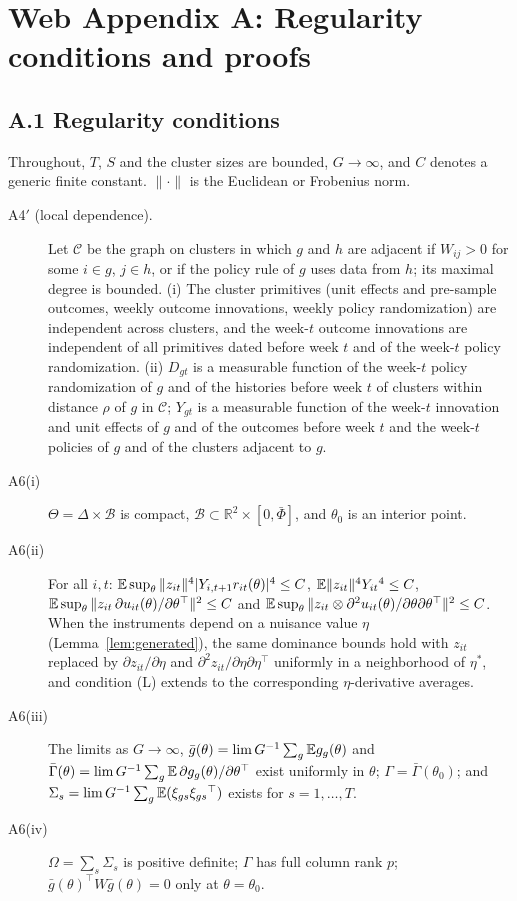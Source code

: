 \appendix
\setcounter{lemma}{2}

\section*{Web Appendix A: Regularity conditions and proofs}
\label{app:proofs}

\subsection{A.1 Regularity conditions}

Throughout, $T$, $S$ and the cluster sizes are bounded, $G\to\infty$, and $C$ denotes a generic
finite constant. $\|\cdot\|$ is the Euclidean or Frobenius norm.

\begin{description}
\item[A4$'$ (local dependence).] Let $\mathcal C$ be the graph on clusters in which $g$ and $h$
are adjacent if $W_{ij}>0$ for some $i\in g$, $j\in h$, or if the policy rule of $g$ uses data
from $h$; its maximal degree is bounded. (i) The cluster primitives (unit effects and pre-sample
outcomes, weekly outcome innovations, weekly policy randomization) are independent across
clusters, and the week-$t$ outcome innovations are independent of all primitives dated before
week $t$ and of the week-$t$ policy randomization. (ii) $D_{gt}$ is a measurable function of the
week-$t$ policy randomization of $g$ and of the histories before week $t$ of clusters within
distance $\rho$ of $g$ in $\mathcal C$; $Y_{gt}$ is a measurable function of the week-$t$ innovation
and unit effects of $g$ and of the outcomes before week $t$ and the week-$t$ policies of $g$ and
of the clusters adjacent to $g$.
\item[A6(i)] $\Theta=\Delta\times\mathcal B$ is compact, $\mathcal B\subset\mathbb R^2\times[0,\bar\Phi]$,
and $\theta_0$ is an interior point.
\item[A6(ii)] For all $i,t$: $\mathbb{E}\sup_\theta\|z_{it}\|^4|Y_{i,t+1}r_{it}(\theta)|^4\le C$,
$\mathbb{E}\|z_{it}\|^4Y_{it}{}^4\le C$, $\mathbb{E}\sup_\theta\|z_{it}\,\partial u_{it}(\theta)/\partial\theta^{\top}\|^2\le C$ and
$\mathbb{E}\sup_\theta\|z_{it}\otimes\partial^2u_{it}(\theta)/\partial\theta\partial\theta^{\top}\|^2\le C$. When the
instruments depend on a nuisance value $\eta$ (Lemma~\ref{lem:generated}), the same dominance bounds
hold with $z_{it}$ replaced by $\partial z_{it}/\partial\eta$ and
$\partial^2z_{it}/\partial\eta\partial\eta^{\top}$ uniformly in a neighborhood of $\eta^*$, and
condition (L) extends to the corresponding $\eta$-derivative averages.
\item[A6(iii)] The limits as $G\to\infty$, $\bar g(\theta)=\lim G^{-1}\sum_g\mathbb{E} g_g(\theta)$ and
$\bar\Gamma(\theta)=\lim G^{-1}\sum_g\mathbb{E}\,\partial g_g(\theta)/\partial\theta^{\top}$ exist uniformly in
$\theta$; $\Gamma=\bar\Gamma(\theta_0)$; and
$\Sigma_s=\lim G^{-1}\sum_g\mathbb{E}(\xi_{gs}\xi_{gs}{}^{\top})$ exists for $s=1,\dots,T$.
\item[A6(iv)] $\Omega=\sum_s\Sigma_s$ is positive definite; $\Gamma$ has full column rank $p$;
$\bar g(\theta)^{\top}W\bar g(\theta)=0$ only at $\theta=\theta_0$.
\end{description}

